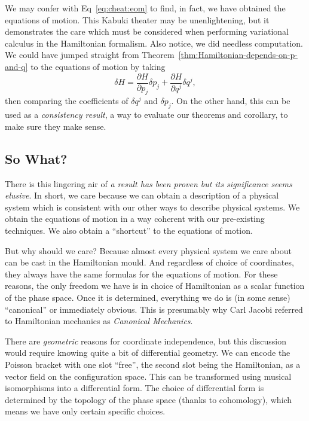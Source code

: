 \M
We may confer with Eq~\eqref{eq:cheat:eom} to find, in fact, we have
obtained the equations of motion. This Kabuki theater may be
unenlightening, but it demonstrates the care which must be considered
when performing variational calculus in the Hamiltonian formalism. Also
notice, we did needless computation. We could have jumped straight from
Theorem~\ref{thm:Hamiltonian-depends-on-p-and-q} to the equations of
motion by taking
\begin{equation}
\delta H = \frac{\partial H}{\partial p_{j}}\delta p_{j} +
\frac{\partial H}{\partial q^{j}}\delta q^{j},
\end{equation}
then comparing the coefficients of $\delta q^{j}$ and $\delta p_{j}$.
On the other hand, this can be used as a \emph{consistency result},
a way to evaluate our theorems and corollary, to make sure they make
sense.

\subsection{So What?}

\M
There is this lingering air of \emph{a result has been proven but its significance seems elusive}.
In short, we care because we can obtain a description of a physical
system which is consistent with our other ways to describe physical
systems. We obtain the equations of motion in a way coherent with our
pre-existing techniques. We also obtain a ``shortcut'' to the equations
of motion.

But why should we care? Because almost every physical system we care
about can be cast in the Hamiltonian mould. And regardless of choice of
coordinates, they always have the same formulas for the equations of
motion. For these reasons, the only freedom we have is in choice of
Hamiltonian as a scalar function of the phase space. Once it is
determined, everything we do is (in some sense) ``canonical'' or
immediately obvious. This is presumably why Carl Jacobi referred to Hamiltonian
mechanics as \emph{Canonical Mechanics}.

There are \emph{geometric} reasons for coordinate independence, but this
discussion would require knowing quite a bit of differential geometry.
We can encode the Poisson bracket with one slot ``free'', the second
slot being the Hamiltonian, as a vector field on the configuration
space. This can be transformed using musical isomorphisms into a
differential form. The choice of differential form is determined by the
topology of the phase space (thanks to cohomology), which means we have
only certain specific choices.

